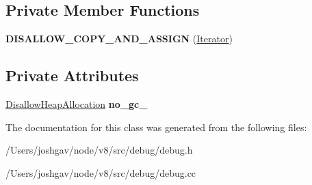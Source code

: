 \subsection*{Private Member Functions}
\begin{DoxyCompactItemize}
\item 
{\bfseries D\+I\+S\+A\+L\+L\+O\+W\+\_\+\+C\+O\+P\+Y\+\_\+\+A\+N\+D\+\_\+\+A\+S\+S\+I\+GN} (\hyperlink{classv8_1_1internal_1_1_break_location_1_1_iterator}{Iterator})\hypertarget{classv8_1_1internal_1_1_break_location_1_1_iterator_ab442c96628ebf29021a5558834383aa9}{}\label{classv8_1_1internal_1_1_break_location_1_1_iterator_ab442c96628ebf29021a5558834383aa9}

\end{DoxyCompactItemize}
\subsection*{Private Attributes}
\begin{DoxyCompactItemize}
\item 
\hyperlink{classv8_1_1internal_1_1_per_thread_assert_scope_debug_only}{Disallow\+Heap\+Allocation} {\bfseries no\+\_\+gc\+\_\+}\hypertarget{classv8_1_1internal_1_1_break_location_1_1_iterator_af092d38d5957f026ffdd5d8aafcc0e78}{}\label{classv8_1_1internal_1_1_break_location_1_1_iterator_af092d38d5957f026ffdd5d8aafcc0e78}

\end{DoxyCompactItemize}


The documentation for this class was generated from the following files\+:\begin{DoxyCompactItemize}
\item 
/\+Users/joshgav/node/v8/src/debug/debug.\+h\item 
/\+Users/joshgav/node/v8/src/debug/debug.\+cc\end{DoxyCompactItemize}
